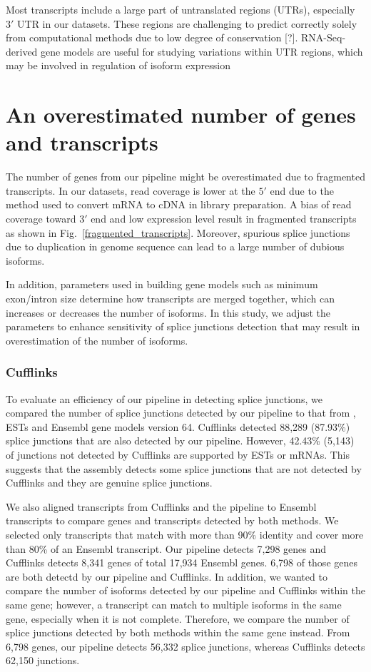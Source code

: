 \documentclass[10pt]{article}
\begin{document}
Most transcripts include a large part of untranslated regions (UTRs),
especially $3'$ UTR in our datasets.
These regions are challenging to predict correctly solely from computational
methods due to low degree of conservation [?].
RNA-Seq-derived gene models are useful for studying variations within UTR
regions, which may be involved in regulation of isoform expression\cite{}

\section*{An overestimated number of genes and transcripts}

The number of genes from our pipeline might be overestimated due to
fragmented transcripts.  In our datasets, read coverage is lower at
the $5'$ end due to the method used to convert mRNA to cDNA in library
preparation.  A bias of read coverage toward $3'$ end and low
expression level result in fragmented transcripts as shown in
Fig.~\ref{fragmented_transcripts}.  Moreover, spurious splice
junctions due to duplication in genome sequence can lead to a large
number of dubious isoforms. 

In addition, parameters used in building gene models such as minimum
exon/intron size determine how transcripts are merged together, which
can increases or decreases the number of isoforms.  In this study, we
adjust the parameters to enhance sensitivity of splice junctions
detection that may result in overestimation of the number of isoforms.

\subsubsection*{Cufflinks}

To evaluate an efficiency of our pipeline in detecting splice junctions,
we compared the number of splice junctions detected by our pipeline to
that from , ESTs and Ensembl gene models version 64.
Cufflinks detected 88,289 (87.93\%) splice junctions that are also detected
by our pipeline.
However, 42.43\% (5,143) of junctions not detected by Cufflinks are supported
by ESTs or mRNAs.
This suggests that the assembly detects some splice junctions that are
not detected by Cufflinks and they are genuine splice junctions.

We also aligned transcripts from Cufflinks and the pipeline to Ensembl
transcripts to compare genes and transcripts detected by both methods.
We selected only transcripts that match with more than 90\% identity and
cover more than 80\% of an Ensembl transcript.
Our pipeline detects 7,298 genes and Cufflinks detects 8,341 genes of
total 17,934 Ensembl genes.
6,798 of those genes are both detectd by our pipeline and Cufflinks.
In addition, we wanted to compare the number of isoforms detected by our
pipeline and Cufflinks within the same gene; however, a transcript can
match to multiple isoforms in the same gene, especially when it is not complete.
Therefore, we compare the number of splice junctions detected by both
methods within the same gene instead.
From 6,798 genes, our pipeline detects 56,332 splice junctions, whereas
Cufflinks detects 62,150 junctions.
\end{document}
